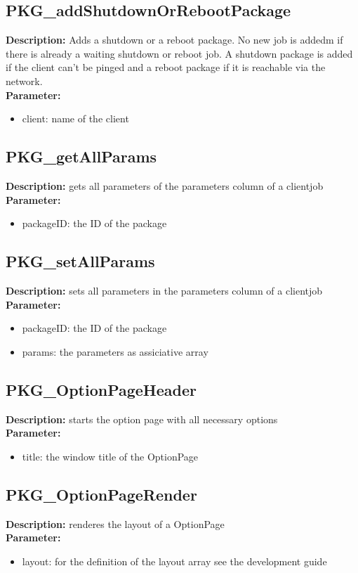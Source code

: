 \subsection{PKG\_addShutdownOrRebootPackage}
\textbf{Description:} Adds a shutdown or a reboot package. No new job is addedm if there is already a waiting shutdown or reboot job. A shutdown package is added if the client can't be pinged and a reboot package if it is reachable via the network.\\
\textbf{Parameter:}
\begin{itemize}
\item client: name of the client
\end{itemize}

\subsection{PKG\_getAllParams}
\textbf{Description:} gets all parameters of the parameters column of a clientjob\\
\textbf{Parameter:}
\begin{itemize}
\item packageID: the ID of the package
\end{itemize}

\subsection{PKG\_setAllParams}
\textbf{Description:} sets all parameters in the parameters column of a clientjob\\
\textbf{Parameter:}
\begin{itemize}
\item packageID: the ID of the package
\item params: the parameters as assiciative array
\end{itemize}

\subsection{PKG\_OptionPageHeader}
\textbf{Description:} starts the option page with all necessary options\\
\textbf{Parameter:}
\begin{itemize}
\item title: the window title of the OptionPage
\end{itemize}

\subsection{PKG\_OptionPageRender}
\textbf{Description:} renderes the layout of a OptionPage\\
\textbf{Parameter:}
\begin{itemize}
\item layout: for the definition of the layout array see the development guide
\end{itemize}

